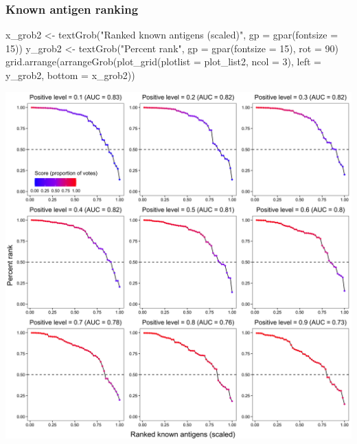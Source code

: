 \documentclass[
  11pt,
  oneside]{book}
\newenvironment{Shaded}{\begin{snugshade}}{\end{snugshade}}
\newcommand{\AttributeTok}[1]{\textcolor[rgb]{0.77,0.63,0.00}{#1}}
\newcommand{\DecValTok}[1]{\textcolor[rgb]{0.00,0.00,0.81}{#1}}
\newcommand{\FunctionTok}[1]{\textcolor[rgb]{0.00,0.00,0.00}{#1}}
\newcommand{\NormalTok}[1]{#1}
\newcommand{\OtherTok}[1]{\textcolor[rgb]{0.56,0.35,0.01}{#1}}
\newcommand{\StringTok}[1]{\textcolor[rgb]{0.31,0.60,0.02}{#1}}
\begin{document}
\hypertarget{known-antigen-ranking}{%
\subsubsection{Known antigen ranking}\label{known-antigen-ranking}}

\begin{Shaded}
\begin{Highlighting}[]
\NormalTok{x\_grob2 }\OtherTok{\textless{}{-}} \FunctionTok{textGrob}\NormalTok{(}\StringTok{"Ranked known antigens (scaled)"}\NormalTok{, }\AttributeTok{gp =} \FunctionTok{gpar}\NormalTok{(}\AttributeTok{fontsize =} \DecValTok{15}\NormalTok{))}
\NormalTok{y\_grob2 }\OtherTok{\textless{}{-}} \FunctionTok{textGrob}\NormalTok{(}\StringTok{"Percent rank"}\NormalTok{, }\AttributeTok{gp =} \FunctionTok{gpar}\NormalTok{(}\AttributeTok{fontsize =} \DecValTok{15}\NormalTok{), }\AttributeTok{rot =} \DecValTok{90}\NormalTok{)}
\FunctionTok{grid.arrange}\NormalTok{(}\FunctionTok{arrangeGrob}\NormalTok{(}\FunctionTok{plot\_grid}\NormalTok{(}\AttributeTok{plotlist =}\NormalTok{ plot\_list2, }\AttributeTok{ncol =} \DecValTok{3}\NormalTok{), }\AttributeTok{left =}\NormalTok{ y\_grob2, }\AttributeTok{bottom =}\NormalTok{ x\_grob2))}
\end{Highlighting}
\end{Shaded}

\begin{center}\includegraphics[width=1\linewidth]{./figures/Supplementary Fig 4} \end{center}
\end{document}
